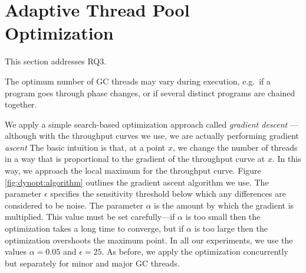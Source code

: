 \section{Adaptive Thread Pool Optimization}
\label{sec:dynamicopt}

This section addresses RQ3.

The optimum number of GC threads may vary during execution, e.g.\ 
if a program goes through phase changes, or if several distinct programs
are chained together.

We apply a simple search-based optimization approach called 
\emph{gradient descent} ---although with the throughput curves we use, we are
actually performing gradient \emph{ascent}
The basic intuition is that, at a point $x$, we change the number of threads
in a way that is proportional to the gradient of the throughput curve at $x$.
In this way, we approach the local maximum for the throughput curve.
Figure \ref{fig:dynopt:algorithm} outlines the gradient ascent algorithm we
use.
The parameter $\epsilon$ specifies the sensitivity threshold below
which any differences are considered to be noise.
The parameter $\alpha$ is the amount by which the gradient is multiplied.
This value must be set carefully---if $\alpha$ is too small then the optimization takes a long time to converge, but if $\alpha$ is too large then the
optimization overshoots the maximum point.
In all our experiments, we use the values $\alpha = 0.05$ and $\epsilon = 25$.
As before, we apply the optimization concurrently but separately for minor and major GC threads.